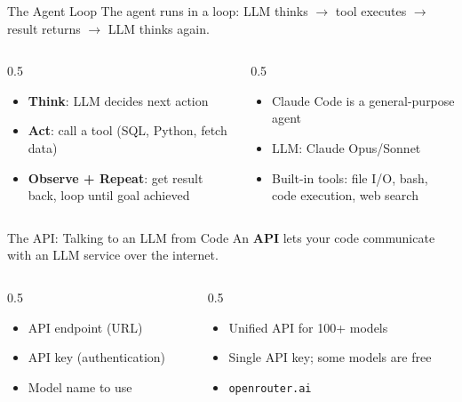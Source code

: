 \documentclass[aspectratio=169]{beamer}
\begin{document}
\begin{frame}{The Agent Loop}
The agent runs in a loop: LLM thinks $\rightarrow$ tool executes $\rightarrow$ result returns $\rightarrow$ LLM thinks again.
\vspace{0.3cm}
\begin{columns}[T]
\begin{column}{0.5\textwidth}
\begin{itemize}\small
  \item \textbf{Think}: LLM decides next action
  \item \textbf{Act}: call a tool (SQL, Python, fetch data)
  \item \textbf{Observe + Repeat}: get result back, loop until goal achieved
\end{itemize}
\end{column}
\begin{column}{0.5\textwidth}
\begin{shadedbox}[title=\textbf{This is exactly what Claude Code does}]
\begin{itemize}\small
  \item Claude Code is a general-purpose agent
  \item LLM: Claude Opus/Sonnet
  \item Built-in tools: file I/O, bash, code execution, web search
\end{itemize}
\end{shadedbox}
\end{column}
\end{columns}
\end{frame}

\begin{frame}{The API: Talking to an LLM from Code}
An \textbf{API} lets your code communicate with an LLM service over the internet.
\vspace{0.3cm}
\begin{columns}[T]
\begin{column}{0.5\textwidth}
\begin{shadedbox}[title=\textbf{What You Need}]
\begin{itemize}\small
  \item API endpoint (URL)
  \item API key (authentication)
  \item Model name to use
\end{itemize}
\end{shadedbox}
\end{column}
\begin{column}{0.5\textwidth}
\begin{shadedbox}[title=\textbf{OpenRouter}]
\begin{itemize}\small
  \item Unified API for 100+ models
  \item Single API key; some models are free
  \item \texttt{openrouter.ai}
\end{itemize}
\end{shadedbox}
\end{column}
\end{columns}
\end{frame}
\end{document}
